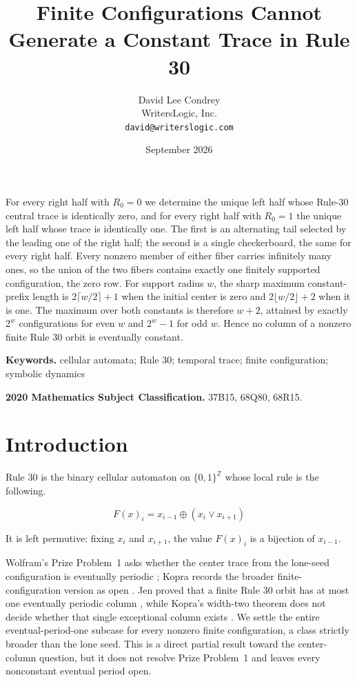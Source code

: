 \documentclass[11pt]{article}
\title{\vspace{-2.2em}Finite Configurations Cannot Generate a Constant Trace in Rule 30}
\author{David Lee Condrey\\WritersLogic, Inc.\\\texttt{david@writerslogic.com}}
\date{September 2026\vspace{-1.5em}}
\renewenvironment{abstract}{\small\quotation}{\endquotation}
\begin{document}
\maketitle

\begin{abstract}
For every right half with $R_0=0$ we determine the unique left half whose
Rule-30 central trace is identically zero, and for every right half with
$R_0=1$ the unique left half whose trace is identically one.  The first is an
alternating tail selected by the leading one of the right half; the second is a
single checkerboard, the same for every right half.  Every nonzero member of
either fiber carries infinitely many ones, so the union of the two fibers
contains exactly one finitely supported configuration, the zero row.  For
support radius $w$, the sharp maximum
constant-prefix length is $2\lceil w/2\rceil+1$ when the initial center is zero
and $2\lfloor w/2\rfloor+2$ when it is one.  The maximum over both constants is
therefore $w+2$, attained by exactly $2^w$ configurations for even $w$ and
$2^w-1$ for odd $w$.  Hence no column of a nonzero finite Rule 30 orbit is
eventually constant.
\end{abstract}

\noindent\textbf{Keywords.} cellular automata; Rule 30; temporal trace;
finite configuration; symbolic dynamics

\noindent\textbf{2020 Mathematics Subject Classification.} 37B15, 68Q80,
68R15.

\section{Introduction}

Rule 30 is the binary cellular automaton on $\{0,1\}^{\mathbb Z}$ whose local
rule is the following.

\begin{equation}\label{eq:rule30}
 F(x)_i=x_{i-1}\mathbin{\oplus}(x_i\mathbin{\lor}x_{i+1})
\end{equation}

It is left permutive: fixing $x_i$ and $x_{i+1}$, the value $F(x)_i$ is a
bijection of $x_{i-1}$.

Wolfram's Prize Problem~1 asks whether the center trace from the lone-seed
configuration is eventually periodic \cite{wolfram}; Kopra records the broader
finite-configuration version as open \cite{kopra-thesis}.  Jen proved that a
finite Rule 30 orbit has at most one eventually periodic column
\cite[Thm.~2b]{jen1986}\cite[Prop.~3]{jen}, while Kopra's width-two theorem
does not decide whether that single exceptional column exists
\cite{kopra}.  We settle the entire eventual-period-one subcase for every
nonzero finite configuration, a class strictly broader than the lone seed.
This is a direct partial result toward the center-column question, but it does
not resolve Prize Problem~1 and leaves every nonconstant eventual period open.
\end{document}
